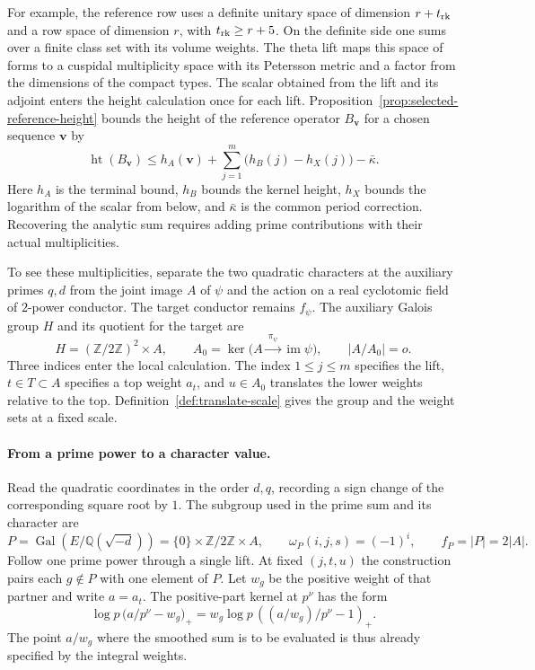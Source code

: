 For example, the reference row uses a definite unitary space of
dimension \(r+t_{\rm rk}\) and a row space of dimension \(r\), with
\(t_{\rm rk}\ge r+5\). On the definite side one sums over a finite
class set with its volume weights. The theta lift maps this space of
forms to a cuspidal multiplicity space with its Petersson metric and
a factor from the dimensions of the compact types. The scalar obtained
from the lift and its adjoint enters the height calculation once for
each lift. Proposition~\ref{prop:selected-reference-height}
bounds the height of the reference operator \(B_{\mathbf v}\) for a chosen
sequence \(\mathbf v\) by
\[
 \operatorname{ht}(B_{\mathbf v})\le h_A(\mathbf v)+\sum_{j=1}^m\bigl(h_B(j)-h_X(j)\bigr)
                               -\bar\kappa .
\]
Here \(h_A\) is the terminal bound, \(h_B\) bounds the kernel height,
\(h_X\) bounds the logarithm of the scalar from below, and
\(\bar\kappa\) is the common period correction. Recovering the analytic
sum requires adding prime contributions with their actual multiplicities.

To see these multiplicities, separate the two quadratic characters
at the auxiliary primes \(q,d\) from the joint image \(A\) of \(\psi\)
and the action on a real cyclotomic field of \(2\)-power conductor.
The target conductor remains \(f_\psi\).
The auxiliary Galois group \(H\) and its quotient for the target are
\[
 H=(\mathbb Z/2\mathbb Z)^2\times A,\qquad
 A_0=\ker\bigl(A\xrightarrow{\ \pi_\psi\ }\operatorname{im}\psi\bigr),
 \qquad |A/A_0|=o .
\]
Three indices enter the local calculation. The index \(1\le j\le m\)
specifies the lift, \(t\in T\subset A\) specifies a top weight \(a_t\),
and \(u\in A_0\) translates the lower weights relative to the top. Definition~\ref{def:translate-scale} gives
the group and the weight sets at a fixed scale.

\paragraph{From a prime power to a character value.}
Read the quadratic coordinates in the order \(d,q\), recording
a sign change of the corresponding square root by \(1\). The subgroup
used in the prime sum and its character are
\[
 P=\operatorname{Gal}(E/\mathbb Q(\sqrt{-d}))
    =\{0\}\times\mathbb Z/2\mathbb Z\times A,\qquad
 \omega_P(i,j,s)=(-1)^i,\qquad f_P=|P|=2|A|.
\] Follow one prime power through a single lift. At fixed \((j,t,u)\) the construction
pairs
each \(g\notin P\) with one element of \(P\). Let \(w_g\) be the
positive weight of that partner and write \(a=a_t\). The positive-part kernel at \(p^\nu\) has the form
\[
 \log p\,\bigl(a/p^\nu-w_g\bigr)_+
     = w_g\log p\,\left((a/w_g)/p^\nu-1\right)_+ .
\]
The point \(a/w_g\) where the smoothed sum is to be evaluated is thus
already specified by the integral weights.

